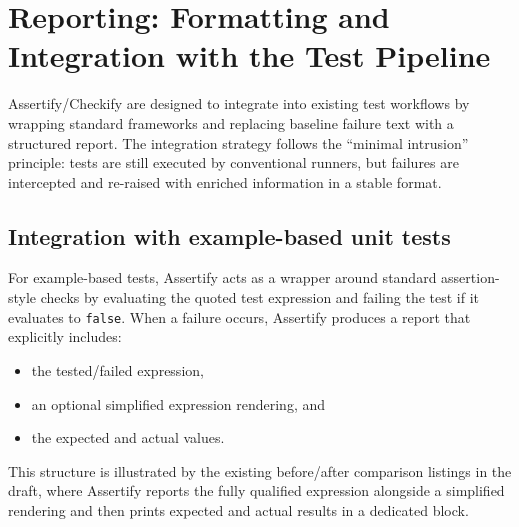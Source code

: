 \section{Reporting: Formatting and Integration with the Test Pipeline} %
  \label{Reporting: Formatting and Integration with the Test Pipeline} %


\improve


\begin{justify}
Assertify/Checkify are designed to integrate into existing test workflows by wrapping standard
frameworks and replacing baseline failure text with a structured report. The integration strategy
follows the ``minimal intrusion'' principle: tests are still executed by conventional runners, but
failures are intercepted and re-raised with enriched information in a stable format.
\end{justify}


\subsection{Integration with example-based unit tests} %
     \label{Integration with example-based unit tests} %


\begin{justify}
For example-based tests, Assertify acts as a wrapper around standard assertion-style checks by
evaluating the quoted test expression and failing the test if it evaluates to \texttt{false}.
When a failure occurs, Assertify produces a report that explicitly includes:

\begin{itemize}
  \item the tested/failed expression,
  \item an optional simplified expression rendering, and
  \item the expected and actual values.
\end{itemize}

This structure is illustrated by the existing before/after comparison listings in the draft, where
Assertify reports the fully qualified expression alongside a simplified rendering and then prints
expected and actual results in a dedicated block.
\end{justify}


